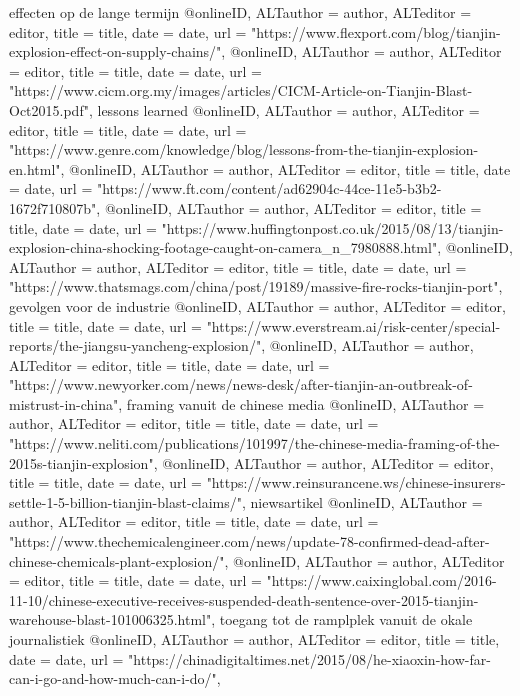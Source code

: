 {{{{{{{{effecten op de lange termijn
@online{ID,	ALTauthor = {author},	ALTeditor = {editor},	title = {title},	date = {date},	url = {"https://www.flexport.com/blog/tianjin-explosion-effect-on-supply-chains/"},}
@online{ID,	ALTauthor = {author},	ALTeditor = {editor},	title = {title},	date = {date},	url = {"https://www.cicm.org.my/images/articles/CICM-Article-on-Tianjin-Blast-Oct2015.pdf"},}
lessons learned
@online{ID,	ALTauthor = {author},	ALTeditor = {editor},	title = {title},	date = {date},	url = {"https://www.genre.com/knowledge/blog/lessons-from-the-tianjin-explosion-en.html"},}
@online{ID,	ALTauthor = {author},	ALTeditor = {editor},	title = {title},	date = {date},	url = {"https://www.ft.com/content/ad62904c-44ce-11e5-b3b2-1672f710807b"},}
@online{ID,	ALTauthor = {author},	ALTeditor = {editor},	title = {title},	date = {date},	url = {"https://www.huffingtonpost.co.uk/2015/08/13/tianjin-explosion-china-shocking-footage-caught-on-camera_n_7980888.html"},}
@online{ID,	ALTauthor = {author},	ALTeditor = {editor},	title = {title},	date = {date},	url = {"https://www.thatsmags.com/china/post/19189/massive-fire-rocks-tianjin-port"},}
gevolgen voor de industrie
@online{ID,	ALTauthor = {author},	ALTeditor = {editor},	title = {title},	date = {date},	url = {"https://www.everstream.ai/risk-center/special-reports/the-jiangsu-yancheng-explosion/"},}
@online{ID,	ALTauthor = {author},	ALTeditor = {editor},	title = {title},	date = {date},	url = {"https://www.newyorker.com/news/news-desk/after-tianjin-an-outbreak-of-mistrust-in-china"},}
framing vanuit de chinese media
@online{ID,	ALTauthor = {author},	ALTeditor = {editor},	title = {title},	date = {date},	url = {"https://www.neliti.com/publications/101997/the-chinese-media-framing-of-the-2015s-tianjin-explosion"},}
@online{ID,	ALTauthor = {author},	ALTeditor = {editor},	title = {title},	date = {date},	url = {"https://www.reinsurancene.ws/chinese-insurers-settle-1-5-billion-tianjin-blast-claims/"},}
niewsartikel
@online{ID,	ALTauthor = {author},	ALTeditor = {editor},	title = {title},	date = {date},	url = {"https://www.thechemicalengineer.com/news/update-78-confirmed-dead-after-chinese-chemicals-plant-explosion/"},}
@online{ID,	ALTauthor = {author},	ALTeditor = {editor},	title = {title},	date = {date},	url = {"https://www.caixinglobal.com/2016-11-10/chinese-executive-receives-suspended-death-sentence-over-2015-tianjin-warehouse-blast-101006325.html"},}
toegang tot de ramplplek vanuit de okale journalistiek
@online{ID,	ALTauthor = {author},	ALTeditor = {editor},	title = {title},	date = {date},	url = {"https://chinadigitaltimes.net/2015/08/he-xiaoxin-how-far-can-i-go-and-how-much-can-i-do/"},}
}}}}}}}}

